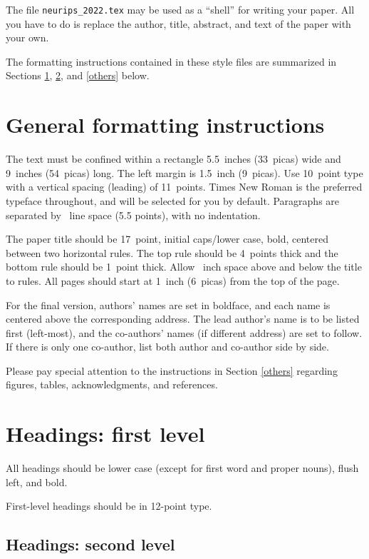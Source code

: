 \documentclass{article}
\begin{document}
The file \verb+neurips_2022.tex+ may be used as a ``shell'' for writing your
paper. All you have to do is replace the author, title, abstract, and text of
the paper with your own.


The formatting instructions contained in these style files are summarized in
Sections \ref{gen_inst}, \ref{headings}, and \ref{others} below.


\section{General formatting instructions}
\label{gen_inst}


The text must be confined within a rectangle 5.5~inches (33~picas) wide and
9~inches (54~picas) long. The left margin is 1.5~inch (9~picas).  Use 10~point
type with a vertical spacing (leading) of 11~points.  Times New Roman is the
preferred typeface throughout, and will be selected for you by default.
Paragraphs are separated by ~line space (5.5 points), with no
indentation.


The paper title should be 17~point, initial caps/lower case, bold, centered
between two horizontal rules. The top rule should be 4~points thick and the
bottom rule should be 1~point thick. Allow ~inch space above and
below the title to rules. All pages should start at 1~inch (6~picas) from the
top of the page.


For the final version, authors' names are set in boldface, and each name is
centered above the corresponding address. The lead author's name is to be listed
first (left-most), and the co-authors' names (if different address) are set to
follow. If there is only one co-author, list both author and co-author side by
side.


Please pay special attention to the instructions in Section \ref{others}
regarding figures, tables, acknowledgments, and references.


\section{Headings: first level}
\label{headings}


All headings should be lower case (except for first word and proper nouns),
flush left, and bold.


First-level headings should be in 12-point type.


\subsection{Headings: second level}
\end{document}
